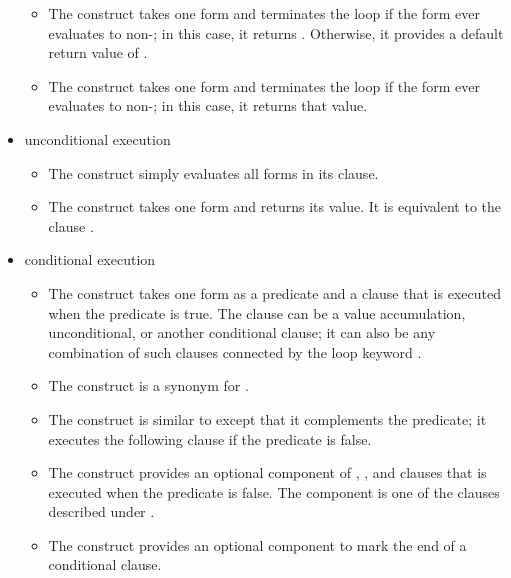 \begin{new}
\begin{itemize}
\begin{itemize}
  \item
  The  construct takes one form and terminates the loop
  if the form ever evaluates to non-; in this case, it returns
  .  Otherwise, it provides a default return value of .

  \item
  The  construct takes one form and terminates the loop
  if the form ever evaluates to non-; in this case, it returns
  that value.
  \end{itemize}

  \item unconditional execution

  \begin{itemize}
  \item
  The  construct simply evaluates all forms in its clause.

  \item
  The  construct takes one form and returns its value.  It is 
  equivalent to the clause .
  \end{itemize}

  \item conditional execution

  \begin{itemize}
  \item
  The  construct takes one form as a predicate and a clause that 
  is executed when the predicate is true. The clause can be a value 
  accumulation, unconditional, or another conditional clause; it can also
  be any combination of such clauses connected by the loop keyword .

  \item
  The  construct is a synonym for .

  \item
  The  construct is similar to  except that it complements
  the predicate; it executes the following clause if the predicate is false.

  \item
  The  construct provides an optional component of ,
  , and  clauses that is executed when the
  predicate is false.  The component is one of the clauses described under
  .

  \item
  The  construct provides an optional component to mark the
  end of a conditional clause.
  \end{itemize}


\end{itemize}
\end{new}
